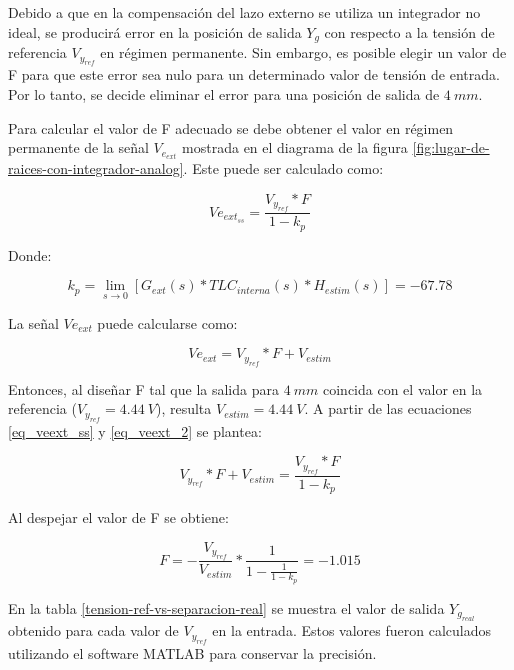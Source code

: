 Debido a que en la compensación del lazo externo se utiliza un integrador no ideal, se producirá error en la posición de salida $Y_g$ con respecto a la tensión de referencia  $V_{y_{ref}}$ en régimen permanente. Sin embargo, es posible elegir un valor de F para que este error sea nulo para un determinado valor de tensión de entrada. Por lo tanto, se decide eliminar el error para una posición de salida de $4\:mm$.

Para calcular el valor de F adecuado se debe obtener el valor en régimen permanente de la señal $V_{e_{ext}}$ mostrada en el diagrama de la figura \ref{fig:lugar-de-raices-con-integrador-analog}. Este puede ser calculado como:

\begin{equation} \label{eq_veext_ss}
	Ve_{ext_{ss}}=\frac{V_{y_{ref}}*F}{1-k_p}
\end{equation}

Donde: 

\begin{equation*}
	k_p=\lim\limits_{s \to 0}[G_{ext}(s)*TLC_{interna}(s)*H_{estim}(s)]=-67.78
\end{equation*}

La señal $Ve_{ext}$ puede calcularse como:

\begin{equation} \label{eq_veext_2}
	Ve_{ext}=V_{y_{ref}}*F+V_{estim}
\end{equation}

Entonces, al diseñar F tal que la salida para $4\:mm$ coincida con el valor en la referencia ($V_{y_{ref}}=4.44\:V$), resulta  $V_{estim}=4.44\:V$. A partir de las ecuaciones \ref{eq_veext_ss} y \ref{eq_veext_2} se plantea:

\begin{equation}
	V_{y_{ref}}*F+V_{estim}=\frac{V_{y_{ref}}*F}{1-k_p}
\end{equation}

Al despejar el valor de F se obtiene:

\begin{equation}
	F=-\frac{V_{y_{ref}}}{V_{estim}}*\frac{1}{1-\frac{1}{1-k_p}}=-1.015
\end{equation}


En la tabla \ref{tension-ref-vs-separacion-real} se muestra el valor de salida $Y_{g_{real}}$ obtenido para cada valor de $V_{y_{ref}}$ en la entrada. Estos valores fueron calculados utilizando el software MATLAB para conservar la precisión.

